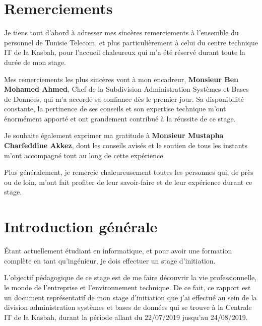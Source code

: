 \documentclass[12pt,a4paper]{report}
\begin{document}
\chapter*{Remerciements}

Je tiens tout d'abord à adresser mes sincères remerciements à l'ensemble du
personnel de Tunisie Telecom, et plus particulièrement à celui du centre
technique IT de la Kasbah, pour l'accueil chaleureux qui m'a été réservé
durant toute la durée de mon stage.

Mes remerciements les plus sincères vont à mon encadreur,
\textbf{Monsieur Ben Mohamed Ahmed}, Chef de la Subdivision Administration
Systèmes et Bases de Données, qui m'a accordé sa confiance dès le premier jour.
Sa disponibilité constante, la pertinence de ses conseils et son expertise
technique m'ont énormément apporté et ont grandement contribué à la réussite
de ce stage.

Je souhaite également exprimer ma gratitude à
\textbf{Monsieur Mustapha Charfeddine Akkez}, dont les conseils avisés et le
soutien de tous les instants m'ont accompagné tout au long de cette expérience.

Plus généralement, je remercie chaleureusement toutes les personnes qui, de
près ou de loin, m'ont fait profiter de leur savoir-faire et de leur expérience
durant ce stage.

\tableofcontents
\listoffigures

\chapter*{Introduction générale}

Étant actuellement étudiant en informatique, et pour avoir une formation
complète en tant qu'ingénieur, je dois effectuer un stage d'initiation.

L'objectif pédagogique de ce stage est de me faire découvrir la vie
professionnelle, le monde de l'entreprise et l'environnement technique.
De ce fait, ce rapport est un document représentatif de mon stage d'initiation
que j'ai effectué au sein de la division administration systèmes et bases de
données qui se trouve à la Centrale IT de la Kasbah, durant la période allant
du 22/07/2019 jusqu'au 24/08/2019.
\end{document}
